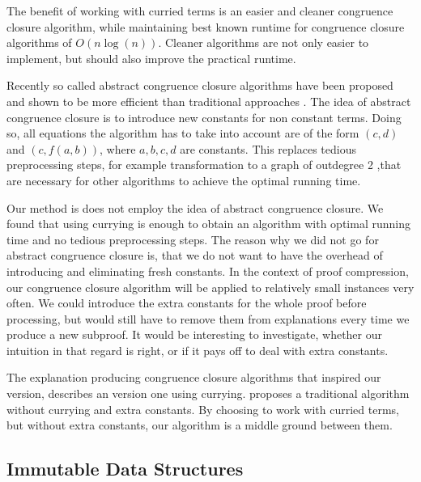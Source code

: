 The benefit of working with curried terms is an easier and cleaner congruence closure algorithm, while maintaining best known runtime for congruence closure algorithms of $O(n \log(n))$.
Cleaner algorithms are not only easier to implement, but should also improve the practical runtime.

Recently so called abstract congruence closure algorithms have been proposed and shown to be more efficient than traditional approaches \cite{Bachmair2000}.
The idea of abstract congruence closure is to introduce new constants for non constant terms.
Doing so, all equations the algorithm has to take into account are of the form $(c,d)$ and $(c, f(a,b))$, where $a,b,c,d$ are constants.
This replaces tedious preprocessing steps, for example transformation to a graph of outdegree 2 \cite{Downey1980},that are necessary for other algorithms to achieve the optimal running time.

Our method is does not employ the idea of abstract congruence closure.
We found that using currying is enough to obtain an algorithm with optimal running time and no tedious preprocessing steps.
The reason why we did not go for abstract congruence closure is, that we do not want to have the overhead of introducing and eliminating fresh constants.
In the context of proof compression, our congruence closure algorithm will be applied to relatively small instances very often.
We could introduce the extra constants for the whole proof before processing, but would still have to remove them from explanations every time we produce a new subproof.
It would be interesting to investigate, whether our intuition in that regard is right, or if it pays off to deal with extra constants.

The explanation producing congruence closure algorithms that inspired our version, \cite{Nieuwenhuis2005,Nieuwenhuis2007} describes an version one using currying.
\cite{Fontaine2004} proposes a traditional algorithm without currying and extra constants.
By choosing to work with curried terms, but without extra constants, our algorithm is a middle ground between them.

\subsection*{Immutable Data Structures}

